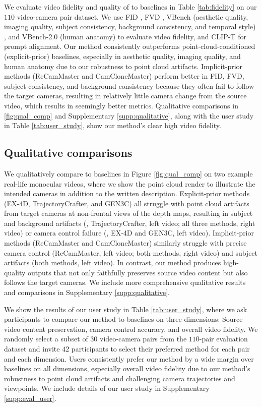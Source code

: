 We evaluate video fidelity and quality of \methodname to baselines in Table \ref{tab:fidelity} on our $110$ video-camera pair dataset. We use FID \cite{heusel2017fid}, FVD \cite{uterthiner2019fvd}, VBench (aesthetic quality, imaging quality, subject consistency, background consistency, and temporal style) \cite{huang2024vbench}, and VBench-2.0 (human anatomy) \cite{zheng2025vbench2} to evaluate video fidelity, and CLIP-T \cite{radford2021clip} for prompt alignment. Our method consistently outperforms point-cloud-conditioned (explicit-prior) baselines, especially in aesthetic quality, imaging quality, and human anatomy due to our robustness to point cloud artifacts. Implicit-prior methods (ReCamMaster and CamCloneMaster) perform better in FID, FVD, subject consistency, and background consistency because they often fail to follow the target cameras, resulting in relatively little camera change from the source video, which results in seemingly better metrics. Qualitative comparisons in \ref{fig:qual_comp} and Supplementary \ref{supp:qualitative}, along with the user study in Table \ref{tab:user_study}, show our method's clear high video fidelity.

\subsection{Qualitative comparisons}
\label{sec:results:qual}

We qualitatively compare \methodname to baselines in Figure \ref{fig:qual_comp} on two example real-life monocular videos, where we show the point cloud render to illustrate the intended cameras in addition to the written description. Explicit-prior methods (EX-4D, TrajectoryCrafter, and GEN3C) all struggle with point cloud artifacts from target cameras at non-frontal views of the depth maps, resulting in subject and background artifacts (\eg, TrajectoryCrafter, left video; all three methods, right video) or camera control failure (\eg, EX-4D and GEN3C, left video). Implicit-prior methods (ReCamMaster and CamCloneMaster) similarly struggle with precise camera control (ReCamMaster, left video; both methods, right video) and subject artifacts (both methods, left video). In contrast, our method produces high-quality outputs that not only faithfully preserves source video content but also follows the target cameras. We include more comprehensive qualitative results and comparisons in Supplementary \ref{supp:qualitative}.

We show the results of our user study in Table \ref{tab:user_study}, where we ask participants to compare our method to baselines on three dimensions: Source video content preservation, camera control accuracy, and overall video fidelity. We randomly select a subset of $30$ video-camera pairs from the $110$-pair evaluation dataset and invite $42$ participants to select their preferred method for each pair and each dimension. Users consistently prefer our method by a wide margin over baselines on all dimensions, especially overall video fidelity due to our method's robustness to point cloud artifacts and challenging camera trajectories and viewpoints. We include details of our user study in Supplementary \ref{supp:eval_user}.


